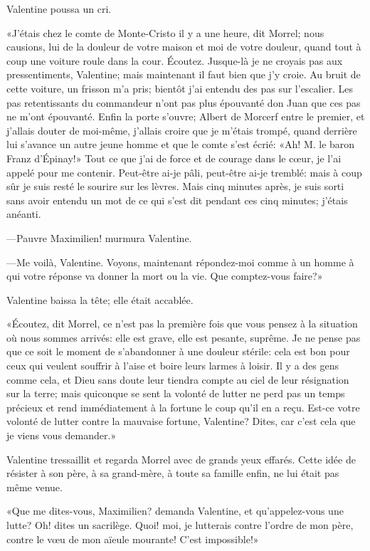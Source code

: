 Valentine poussa un cri. 

«J'étais chez le comte de Monte-Cristo il y a une heure, dit Morrel; nous causions, lui de la douleur de votre maison et moi de votre douleur, quand tout à coup une voiture roule dans la cour. Écoutez. Jusque-là je ne croyais pas aux pressentiments, Valentine; mais maintenant il faut bien que j'y croie. Au bruit de cette voiture, un frisson m'a pris; bientôt j'ai entendu des pas sur l'escalier. Les pas retentissants du commandeur n'ont pas plus épouvanté don Juan que ces pas ne m'ont épouvanté. Enfin la porte s'ouvre; Albert de Morcerf entre le premier, et j'allais douter de moi-même, j'allais croire que je m'étais trompé, quand derrière lui s'avance un autre jeune homme et que le comte s'est écrié: «Ah! M. le baron Franz d'Épinay!» Tout ce que j'ai de force et de courage dans le cœur, je l'ai appelé pour me contenir. Peut-être ai-je pâli, peut-être ai-je tremblé: mais à coup sûr je suis resté le sourire sur les lèvres. Mais cinq minutes après, je suis sorti sans avoir entendu un mot de ce qui s'est dit pendant ces cinq minutes; j'étais anéanti. 

—Pauvre Maximilien! murmura Valentine. 

—Me voilà, Valentine. Voyons, maintenant répondez-moi comme à un homme à qui votre réponse va donner la mort ou la vie. Que comptez-vous faire?» 

Valentine baissa la tête; elle était accablée. 

«Écoutez, dit Morrel, ce n'est pas la première fois que vous pensez à la situation où nous sommes arrivés: elle est grave, elle est pesante, suprême. Je ne pense pas que ce soit le moment de s'abandonner à une douleur stérile: cela est bon pour ceux qui veulent souffrir à l'aise et boire leurs larmes à loisir. Il y a des gens comme cela, et Dieu sans doute leur tiendra compte au ciel de leur résignation sur la terre; mais quiconque se sent la volonté de lutter ne perd pas un temps précieux et rend immédiatement à la fortune le coup qu'il en a reçu. Est-ce votre volonté de lutter contre la mauvaise fortune, Valentine? Dites, car c'est cela que je viens vous demander.»  

Valentine tressaillit et regarda Morrel avec de grands yeux effarés. Cette idée de résister à son père, à sa grand-mère, à toute sa famille enfin, ne lui était pas même venue. 

«Que me dites-vous, Maximilien? demanda Valentine, et qu'appelez-vous une lutte? Oh! dites un sacrilège. Quoi! moi, je lutterais contre l'ordre de mon père, contre le vœu de mon aïeule mourante! C'est impossible!» 


